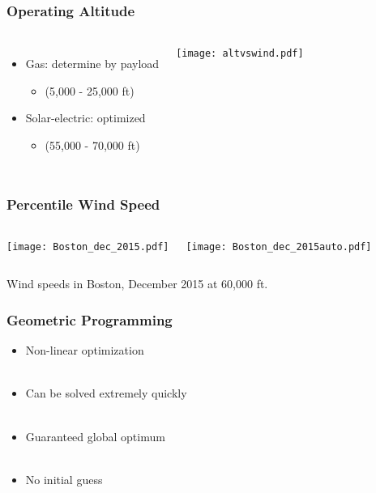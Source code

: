 \documentclass{beamer}
\begin{document}
\begin{frame}
    \frametitle{Operating Altitude}
    
    \begin{columns}
        \begin{itemize}
            \item Gas: determine by payload
                \begin{itemize}
                    \item (5,000 - 25,000 ft)
                    \end{itemize}
            \item Solar-electric: optimized 
                \begin{itemize}
                    \item (55,000 - 70,000 ft)
                    \end{itemize}
                \end{itemize}
        
        \texttt{[image: altvswind.pdf]}
    \end{columns}

\end{frame}

\begin{frame}
    \frametitle{Percentile Wind Speed}
    
    \begin{columns}
        \texttt{[image: Boston\_dec\_2015.pdf]}
        
        \texttt{[image: Boston\_dec\_2015auto.pdf]}
    \end{columns}

    \begin{center}
    Wind speeds in Boston, December 2015 at 60,000 ft. 
    \end{center}
    
\end{frame}

\begin{frame}
    \frametitle{Geometric Programming}
    \begin{itemize}
        \item Non-linear optimization \\~\\
        \item Can be solved extremely quickly \\~\\
        \item Guaranteed global optimum \\~\\
        \item No initial guess
        \end{itemize}
\end{frame}
\end{document}
